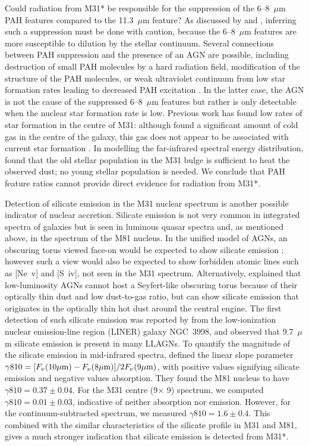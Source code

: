 \documentclass[useAMS,usenatbib,a4paper]{mn2e}
\begin{document}
Could radiation from M31* be responsible for the suppression of the  6--8~$\mu$m PAH features compared
to the 11.3~$\mu$m feature?
As discussed by  \citet{Smith:2007lr} and \citet{Smith2010}, inferring such a suppression must be done with caution, 
because the 6--8~$\mu$m features are more susceptible to dilution by the stellar continuum. 
Several connections between PAH suppression and the presence of an AGN are possible, including destruction of small PAH molecules by a hard radiation field, modification of the structure of the PAH molecules, or weak ultraviolet continuum from low star formation rates 
leading to decreased PAH excitation \citep{Smith:2007lr, Diamond2010}.  In the latter case, the AGN is not the cause of the suppressed  6--8~$\mu$m features but rather is only detectable when the nuclear star formation rate is low.
Previous work has found low rates of star formation in the centre of M31: although \citet{Melchior2013} found a significant 
amount of cold gas in the centre of the galaxy, this gas does not appear to be associated with current star formation \citep[see also][]{Li09}.
In modelling the far-infrared spectral energy distribution, \cite{Groves2012} found that  
the old stellar population in the M31 bulge is sufficient to heat the observed dust; no young stellar population is needed. We conclude that PAH feature ratios cannot provide direct evidence for radiation from M31*.


Detection of silicate emission in the M31 nuclear spectrum is another possible indicator of nuclear accretion.
Silicate emission is not very common in integrated spectra of galaxies \citep{Spoon2007} but is seen in luminous 
quasar spectra \citep[e.g.][]{Hill14} and, as mentioned above, in the spectrum of the M81 nucleus. 
In the unified model of AGNs, an obscuring torus viewed face-on would be expected to show silicate emission
\citep{AGNtypes1995, AGNref}; however such a view would also be expected to show forbidden atomic lines such as [Ne~{\sc v}] and [S~{\sc iv}],
not seen in the M31 spectrum. Alternatively, \citet{Mason2012} explained that low-luminosity AGNs cannot 
host a Seyfert-like obscuring torus because of their optically thin dust and low dust-to-gas ratio, but can show
silicate emission that originates in the optically thin hot dust around the central engine.  The first detection of such silicate emission was 
reported by \citet{Sturm2005} from the low-ionization nuclear emission-line region (LINER) galaxy NGC~3998, and 
\citet{Mason2012}  observed that  9.7~$\mu$m silicate emission is present in many LLAGNs. 
To quantify the magnitude of the silicate emission in mid-infrared spectra, \citet{Smith2010} defined
the linear slope parameter $\gamma810 =[F_{\nu}(10\mu{\rm m}) -F_{\nu}(8\mu{\rm m})]/2F_{\nu}(9\mu{\rm m})$,
with positive values signifying silicate emission and negative values absorption. They found the M81 nucleus to have
$\gamma810=0.37\pm0.04$. For the M31 centre (9\arcsec $\times$ 9\arcsec) spectrum, we computed  $\gamma810 =0.01\pm 0.03$,
indicative of neither absorption nor emission. However, for the continuum-subtracted spectrum, we measured   $\gamma810 =1.6\pm 0.4$. This combined with the similar characteristics of the silicate profile in M31 and M81, gives a much stronger indication that silicate emission is detected from M31*.
\end{document}
